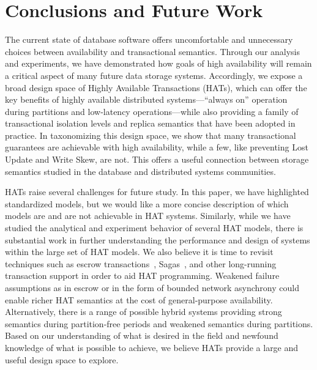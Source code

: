 
\section{Conclusions and Future Work}
The current state of database software offers uncomfortable and
unnecessary choices between availability and transactional semantics.
Through our analysis and experiments, we have demonstrated how goals
of high availability will remain a critical aspect of many future data
storage systems. Accordingly, we expose a broad design space of Highly
Available Transactions (HATs), which can offer the key benefits of
highly available distributed systems---``always on'' operation during
partitions and low-latency operations---while also providing a family
of transactional isolation levels and replica semantics that have been
adopted in practice.  In taxonomizing this design space, we show that
many transactional guarantees are achievable with high availability,
while a few, like preventing Lost Update and Write Skew, are not. This
offers a useful connection between storage semantics studied in the
database and distributed systems communities.

HATs raise several challenges for future study. In this paper, we have
highlighted standardized models, but we would like a more concise
description of which models are and are not achievable in HAT
systems. Similarly, while we have studied the analytical and
experiment behavior of several HAT models, there is substantial work
in further understanding the performance and design of systems within
the large set of HAT models. We also believe it is time to revisit
techniques such as escrow transactions~\cite{escrow},
Sagas~\cite{sagas}, and other long-running transaction support in
order to aid HAT programming. Weakened failure assumptions as in
escrow or in the form of bounded network asynchrony could enable
richer HAT semantics at the cost of general-purpose
availability. Alternatively, there is a range of possible hybrid
systems providing strong semantics during partition-free periods and
weakened semantics during partitions. Based on our understanding of
what is desired in the field and newfound knowledge of what is
possible to achieve, we believe HATs provide a large and useful design
space to explore.


